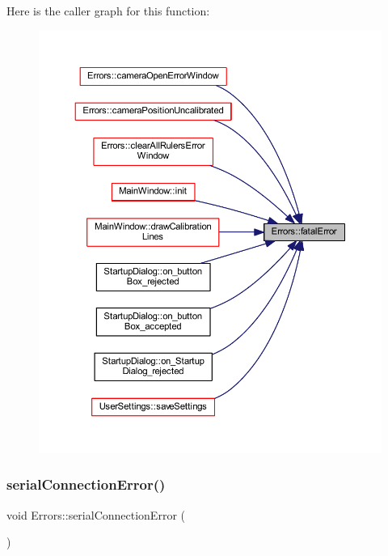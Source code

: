 Here is the caller graph for this function\+:
\nopagebreak
\begin{figure}[H]
\begin{center}
\leavevmode
\includegraphics[width=350pt]{classErrors_afe4cb66263186b59444271e7ca44e025_icgraph}
\end{center}
\end{figure}
\mbox{\label{classErrors_a5ed088325fbe34556ae24b8167eaf0fd}} 
\subsubsection{\texorpdfstring{serialConnectionError()}{serialConnectionError()}}
{\footnotesize\ttfamily void Errors\+::serial\+Connection\+Error (\begin{DoxyParamCaption}{ }\end{DoxyParamCaption})\hspace{0.3cm}{\ttfamily [static]}}



